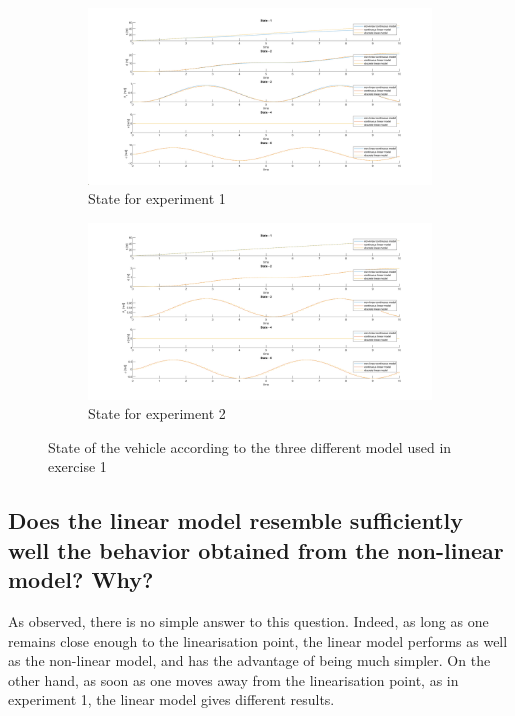 \begin{figure}[H]
    \centering
     \begin{subfigure}[b]{0.8\textwidth}
         \centering
         \includegraphics[width=\textwidth]{Latex report/image/ex1/state1.png}
         \caption{State for experiment 1}
         \label{fig:state11}
     \end{subfigure}
     \begin{subfigure}[b]{0.8\textwidth}
         \centering
         \includegraphics[width=\textwidth]{Latex report/image/ex1/state2.png}
         \caption{State for experiment 2}
         \label{fig:state12}
     \end{subfigure}
    \caption{State of the vehicle according to the three different model used in exercise 1}
    \label{fig:stateEx1}
\end{figure}



\subsection{Does the linear model resemble sufficiently well the behavior obtained from the non-linear model? Why?}

As observed, there is no simple answer to this question. Indeed, as long as one remains close enough to the linearisation point, the linear model performs as well as the non-linear model, and has the advantage of being much simpler. On the other hand, as soon as one moves away from the linearisation point, as in experiment 1, the linear model gives different results.

